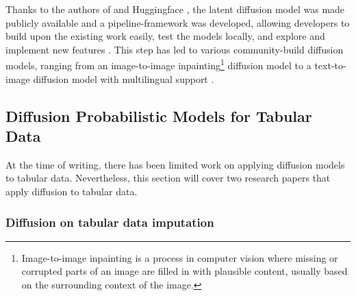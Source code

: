 Thanks to the authors of \cite{rombach2022HighResolutionImageSynthesis} and Huggingface \cite{huggingface2023HuggingFaceAI}, the latent diffusion \gls{model} was made publicly available and a
pipeline-framework was developed, allowing developers to build upon the existing work easily, test the \glspl{model} locally, and explore and implement new features \cite{huggingface2023DiffusersPipelines}.
This step has led to various community-build diffusion \glspl{model}, ranging from an image-to-image inpainting\footnote{Image-to-image inpainting is a process in computer vision where missing or corrupted parts of an image are filled in with plausible content, usually based on the surrounding context of the image.} diffusion \gls{model} to a text-to-image diffusion \gls{model} with multilingual support \cite{huggingface2023CommunityExamples}.

\subsection{Diffusion Probabilistic Models for Tabular Data}
\label{ch:preliminaries-generativeAlgorithms-diffusionProbabilisticModelsTabularData}
At the time of writing, there has been limited work on applying diffusion \glspl{model} to tabular data.
Nevertheless, this section will cover two research papers that apply diffusion to tabular data.

\subsubsection{Diffusion on tabular data imputation}

